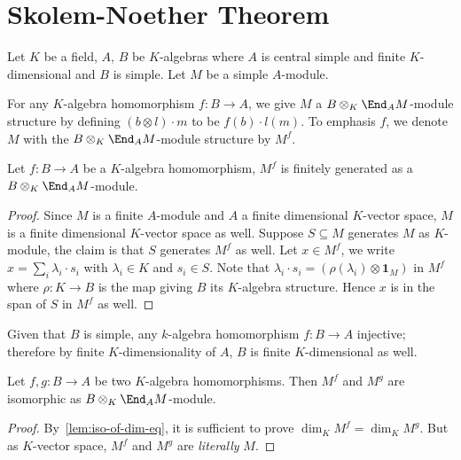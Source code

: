 \section{Skolem-Noether Theorem}\label{sec:skolem-noether}

Let $K$ be a field, $A$, $B$ be $K$-algebras where $A$ is central simple and
finite $K$-dimensional and $B$ is simple. Let $M$ be a simple $A$-module.

\begin{construction}
  For any $K$-algebra homomorphism $f : B \to A$, we give $M$ a
  $B \otimes_{K}\End_{A}M$-module structure by defining $(b\otimes l)\cdot m$ to
  be $f(b)\cdot l(m)$. To emphasis $f$, we denote $M$ with the
  $B\otimes_{K}\End_{A}M$-module structure by $M^{f}$.
  \leanok
\end{construction}

\begin{lemma}
  Let $f : B \to A$ be a $K$-algebra homomorphism, $M^{f}$ is finitely generated
  as a $B\otimes_{K}\End_{A}M$-module.
  \leanok
\end{lemma}
\begin{proof}
  Since $M$ is a finite $A$-module and $A$ a finite dimensional $K$-vector
  space, $M$ is a finite dimensional $K$-vector space as well. Suppose
  $S \subseteq M$ generates $M$ as $K$-module, the claim is that $S$ generates
  $M^{f}$ as well. Let $x \in M^{f}$, we write
  $x = \sum_{i}\lambda_{i}\cdot s_{i}$ with $\lambda_{i}\in K$ and $s_{i}\in S$.
  Note that $\lambda_{i}\cdot s_{i} = (\rho(\lambda_{i})\otimes\mathbf{1}_{M})$
  in $M^{f}$ where $\rho : K \to B$ is the map giving $B$ its $K$-algebra
  structure. Hence $x$ is in the span of $S$ in $M^{f}$ as well.
\end{proof}

\begin{remark}
  Given that $B$ is simple, any $k$-algebra homomorphism $f : B\to A$ injective;
  therefore by finite $K$-dimensionality of $A$, $B$ is finite $K$-dimensional
  as well.
\end{remark}

\begin{lemma}
  \label{lem:iso-fg}
  Let $f,g : B \to A$ be two $K$-algebra homomorphisms. Then $M^{f}$ and $M^{g}$
  are isomorphic as $B\otimes_{K}\End_{A}M$-module.
  \leanok
\end{lemma}

\begin{proof}
  By~\cref{lem:iso-of-dim-eq}, it is sufficient to prove
  $\dim_{K}M^{f}=\dim_{K}M^{g}$. But as $K$-vector space, $M^{f}$ and $M^{g}$
  are {\em literally\/} $M$.
\end{proof}

